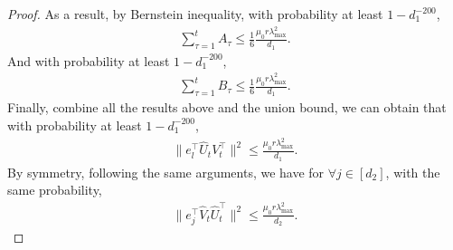 \documentclass[12pt]{article}
\theoremstyle{plain}
\begin{document}
\begin{proof}
As a result, by Bernstein inequality, with probability at least $1-d_1^{-200}$, 
\begin{align*}
    \sum_{\tau=1}^{t}A_{\tau}\leq \frac{1}{6}\frac{\mu_0r\lambda_{\max}^2}{d_1}.
\end{align*} 
And with  probability at least $1-d_1^{-200}$,
\begin{align*}
    \sum_{\tau=1}^{t}B_{\tau}\leq \frac{1}{6}\frac{\mu_0r\lambda_{\max}^2}{d_1}.
\end{align*} 
Finally, combine all the results above and the union bound, we can obtain that with probability at least $1-d_1^{-200}$, 
\begin{align*}
    \|e_l^{\top}\widehat{U}_{t}V_t^{\top}\|^2\leq \frac{\mu_0r\lambda_{\max}^2}{d_1}.
\end{align*}
By symmetry, following the same arguments, we have for $\forall j \in [d_2]$, with the same probability,
\begin{align*}
    \|e_j^{\top}\widehat{V}_{t}\widehat{U}_t^{\top}\|^2\leq \frac{\mu_0r\lambda_{\max}^2}{d_2}.
\end{align*}
\end{proof}
\end{document}
